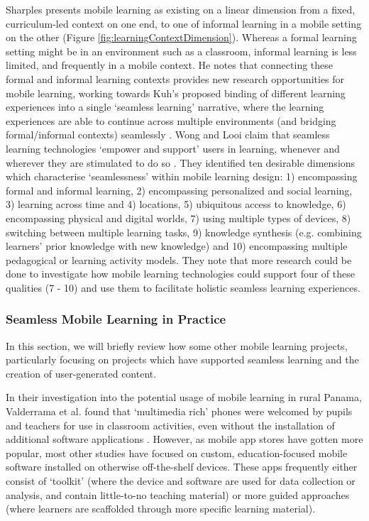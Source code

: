Sharples presents mobile learning as existing on a linear dimension from a fixed, curriculum-led context on one end, to one of informal learning in a mobile setting on the other \citep{Sharples2013} (Figure \ref{fig:learningContextDimension}). Whereas a formal learning setting might be in an environment such as a classroom, informal learning is less limited, and frequently in a mobile context. He notes that connecting these formal and informal learning contexts provides new research opportunities for mobile learning, working towards Kuh’s proposed binding of different learning experiences into a single ‘seamless learning’ narrative, where the learning experiences are able to continue across multiple environments (and bridging formal/informal contexts) seamlessly \citep{Kuh1996}. Wong and Looi claim that seamless learning technologies ‘empower and support’ users in learning, whenever and wherever they are stimulated to do so \citep{Wong2011}. They identified ten desirable dimensions which characterise ‘seamlessness’ within mobile learning design: 1) encompassing formal and informal learning, 2) encompassing personalized and social learning, 3) learning across time and 4) locations, 5) ubiquitous access to knowledge, 6) encompassing physical and digital worlds, 7) using multiple types of devices, 8) switching between multiple learning tasks, 9) knowledge synthesis (e.g. combining learners’ prior knowledge with new knowledge) and 10) encompassing multiple pedagogical or learning activity models. They note that more research could be done to investigate how mobile learning technologies could support four of these qualities (7 - 10) and use them to facilitate holistic seamless learning experiences. 

\subsubsection{Seamless Mobile Learning in Practice}
In this section, we will briefly review how some other mobile learning projects, particularly focusing on projects which have supported seamless learning and the creation of user-generated content. 

In their investigation into the potential usage of mobile learning in rural Panama, Valderrama et al. found that ‘multimedia rich’ phones were welcomed by pupils and teachers for use in classroom activities, even without the installation of additional software applications \citep{ValderramaBahamondez2011}. However, as mobile app stores have gotten more popular, most other studies have focused on custom, education-focused mobile software installed on otherwise off-the-shelf devices. These apps frequently either consist of `toolkit' (where the device and software are used for data collection or analysis, and contain little-to-no teaching material) or more guided approaches (where learners are scaffolded through more specific learning material). 

